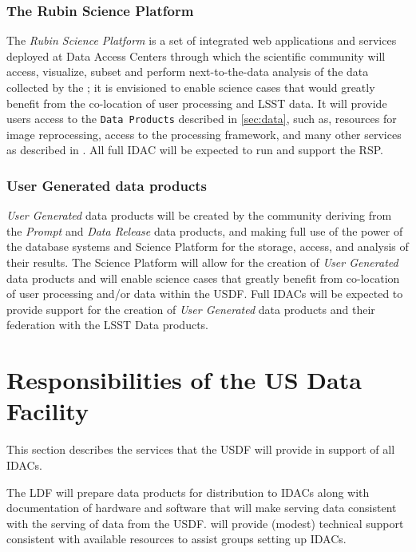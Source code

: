 \subsubsection{The Rubin \gls{Science Platform}}

The {\it Rubin \gls{Science Platform}}   is a set of integrated web applications and services deployed at  \RO Data Access Centers through which the scientific community will access, visualize, subset and perform next-to-the-data analysis of the data collected by the \RO; it is envisioned to enable science cases that would greatly benefit from the co-location of user processing and \gls{LSST} data. It will provide users access to the {\tt Data Products} described in \ref{sec:data}, such as, resources for image reprocessing, access to the \RO processing framework, and many other services as described in .  All full \gls{IDAC} will be expected to run and support the \gls{RSP}.

\subsubsection{User Generated data products }

{\it User Generated} data products will be created by the community deriving from the {\it Prompt} and {\it \gls{Data Release}} data products, and making  full use of the power of the \RO database systems and
Science Platform for the storage, access, and analysis of their results.
The \gls{Science Platform} will allow for the creation of {\it User Generated} data products and will enable science cases that greatly benefit from co-location of user processing and/or data within the USDF. Full IDACs will be expected to provide support for the creation of {\it User Generated} data products and their federation with the \gls{LSST} Data products.

\section{Responsibilities of the \gls{US} Data Facility}

This section describes the services that the USDF will provide in support of all  IDACs.

The \gls{LDF} will prepare data products for distribution to IDACs along with documentation of hardware and software that will make serving \RO data consistent with the serving of data from the USDF. \RO will provide (modest) technical support consistent with available resources to assist groups setting up IDACs.

